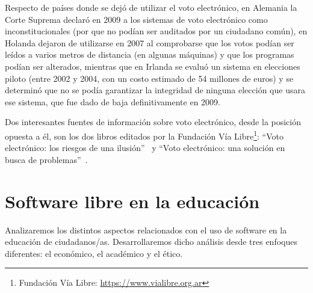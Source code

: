 Respecto de países donde se dejó de utilizar el voto electrónico, en Alemania la Corte Suprema declaró en 2009 a los sistemas de voto electrónico como inconstitucionales (por que no podían ser auditados por un ciudadano común), en Holanda dejaron de utilizarse en 2007 al comprobarse que los votos podían ser leídos a varios metros de distancia (en algunas máquinas) y que los programas podían ser alterados, mientras que en Irlanda se evaluó un sistema en elecciones piloto (entre 2002 y 2004, con un costo estimado de 54 millones de euros) y se determinó que no se podía garantizar la integridad de ninguna elección que usara ese sistema, que fue dado de baja definitivamente en 2009.

Dos interesantes fuentes de información sobre voto electrónico, desde la posición opuesta a él, son los dos libros editados por la Fundación Vía Libre\footnote{Fundación Vía Libre: \url{https://www.vialibre.org.ar}}: ``Voto electrónico: los riesgos de una ilusión''~\cite{busaniche08} y ``Voto electrónico: una solución en busca de problemas''~\cite{busaniche17}.

\section{Software libre en la educación}

Analizaremos los distintos aspectos relacionados con el uso de software en la educación de ciudadanos/as. Desarrollaremos dicho análisis desde tres enfoques diferentes: el económico, el académico y el ético.

